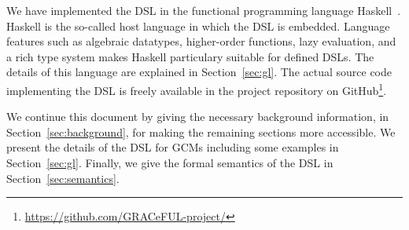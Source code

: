 We have implemented the \acl{DSL} in the functional programming language
Haskell~\cite{haskell98}. Haskell is the so-called host language in which the
\ac{DSL} is embedded. Language features such as algebraic datatypes,
higher-order functions, lazy evaluation, and a rich type system makes Haskell
particulary suitable for defined \acp{DSL}. The details of this language are
explained in Section~\ref{sec:gl}. The actual source code implementing the DSL
is freely available in the project repository on
GitHub\footnote{\url{https://github.com/GRACeFUL-project/}}.


We continue this document by giving the necessary background information, in
Section~\ref{sec:background}, for making the remaining sections more accessible.
We present the details of the \ac{DSL} for \acp{GCM} including some examples in
Section~\ref{sec:gl}. Finally, we give the formal semantics of the \ac{DSL} in
Section~\ref{sec:semantics}.
